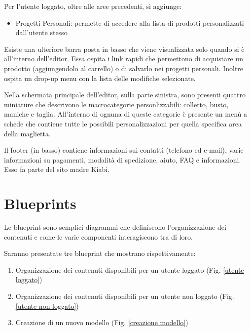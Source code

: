 \documentclass[12pt,italian,]{report}
\providecommand{\tightlist}{%
  \setlength{\itemsep}{0pt}\setlength{\parskip}{0pt}}
\begin{document}
Per l'utente loggato, oltre alle aree precedenti, si aggiunge:

\begin{itemize}
\tightlist
\item
  Progetti Personali: permette di accedere alla lista di prodotti   personalizzati dall'utente stesso
\end{itemize}

Esiste una ulteriore barra posta in basso che viene visualizzata solo quando si è all'interno dell'editor. Essa ospita i link rapidi che permettono di acquistare un prodotto (aggiungendolo al carrello) o di salvarlo nei progetti personali. Inoltre ospita un drop-up menu con la lista delle modifiche selezionate.

Nella schermata principale dell'editor, sulla parte sinistra, sono presenti quattro miniature che descrivono le macrocategorie personlizzabili: colletto, busto, maniche e taglia. All'interno di ognuna di queste categorie è presente un menù a schede che contiene tutte le possibili personalizzazioni per quella specifica area della maglietta. 

Il footer (in basso) contiene informazioni sui contatti (telefono ed e-mail), varie informazioni su pagamenti, modalità di spedizione, aiuto, FAQ e informazioni. Esso fa parte del sito madre Kiabi.

\newpage
\hypertarget{blueprints}{%
\section{Blueprints}\label{blueprints}}

Le blueprint sono semplici diagrammi che definiscono l'organizzazione dei contenuti e come le varie componenti interagiscono tra di loro.

Saranno presentate tre blueprint che mostrano rispettivamente:

\begin{enumerate}
\def\labelenumi{\arabic{enumi}.}
\item
  Organizzazione dei contenuti disponibili per un utente loggato (Fig. \ref{utente loggato})
\item
  Organizzazione dei contenuti disponibili per un utente non loggato (Fig. \ref{utente non loggato})
\item
  Creazione di un nuovo modello (Fig. \ref{creazione modello})
\end{enumerate}
\end{document}
